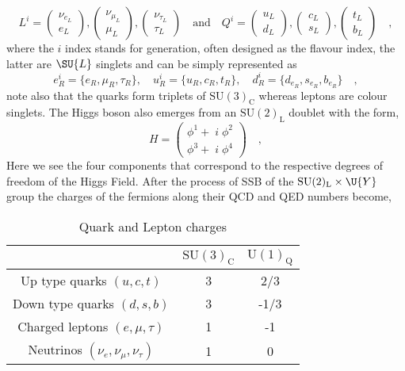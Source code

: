 \begin{equation}
L^i= \begin{pmatrix}
\nu_{e_L} \\ e_L 
\end{pmatrix},
\begin{pmatrix}
\nu_{\mu_L} \\ \mu_L 
\end{pmatrix},
\begin{pmatrix}
\nu_{\tau_L} \\ \tau_L 
\end{pmatrix} 
\quad 
\text{and} \quad Q^i= \begin{pmatrix}
u_{L} \\
d_L 
\end{pmatrix},\begin{pmatrix}
c_{L} \\
s_L 
\end{pmatrix}
,\begin{pmatrix}
t_{L} \\
b_L 
\end{pmatrix} \quad ,
\end{equation}
where the $i$ index stands for generation, often designed as the flavour index, the latter are $\SU{L}$ singlets and can be simply represented as
%
 \begin{equation}
e^i_R=\{e_R,\mu_R,\tau_R\}, \quad  u^i_R=\{u_R,c_R,t_R\}, \quad d^i_R=\{d_{e_R},s_{e_R},b_{e_R}\} \quad , 
\end{equation}
%
note also that the quarks form triplets of $\mathrm{SU(3)_C}$ whereas leptons are colour singlets. The Higgs boson also emerges from an $\mathrm{SU(2)_L}$ doublet with the form,
%
\begin{equation}
H=\begin{pmatrix}
\phi^1 + \; i \; \phi^2 \\
\phi^3 + \; i \; \phi^4  
\end{pmatrix} \quad , 
\end{equation}
%
%
%
Here we see the four components that correspond to the respective degrees of freedom of the Higgs Field. 
% 
After the process of SSB of the $\mathrm{SU(2)_L} \times \U{Y}$ group the charges of the fermions along their QCD and QED numbers become, 

\begin{table}[H]
\caption{Quark and Lepton charges}
\centering
\begin{tabular}{ccc}
  \hline & $\mathrm{SU(3)_C}$ & $\mathrm{U(1)_Q}$ \\
  \hline 
Up type quarks $(u,c,t)$ & 3 & 2/3 \\
Down type quarks $(d,s,b)$ & 3 & -1/3 \\
Charged leptons $(e,\mu,\tau)$ & 1 & -1 \\
Neutrinos  $(\nu_e,\nu_\mu,\nu_\tau)$  & 1 & 0 \\
  \hline	
\end{tabular}
\end{table}

